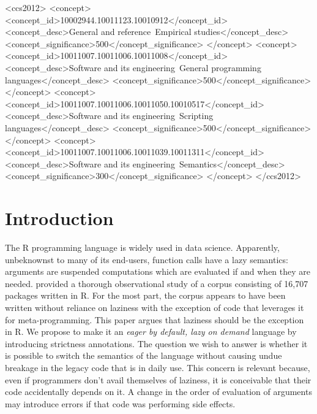 \documentclass[review,nonacm,screen,acmsmall,anonymous=true]{acmart}
\begin{document}
\begin{CCSXML}
<ccs2012>
<concept>
<concept_id>10002944.10011123.10010912</concept_id>
<concept_desc>General and reference~Empirical studies</concept_desc>
<concept_significance>500</concept_significance>
</concept>
<concept>
<concept_id>10011007.10011006.10011008</concept_id>
<concept_desc>Software and its engineering~General programming languages</concept_desc>
<concept_significance>500</concept_significance>
</concept>
<concept>
<concept_id>10011007.10011006.10011050.10010517</concept_id>
<concept_desc>Software and its engineering~Scripting languages</concept_desc>
<concept_significance>500</concept_significance>
</concept>
<concept>
<concept_id>10011007.10011006.10011039.10011311</concept_id>
<concept_desc>Software and its engineering~Semantics</concept_desc>
<concept_significance>300</concept_significance>
</concept>
</ccs2012>
\end{CCSXML}



\maketitle
\section{Introduction}

The R programming language is widely used in data science. Apparently, unbeknownst to many
of its end-users, function calls have a lazy semantics: arguments are suspended
computations which are evaluated if and when they are needed. \citet{oopsla19b}
provided a thorough observational study of a corpus consisting of 16,707
packages written in R. For the most part, the corpus appears to have been
written without reliance on laziness with the exception of code that leverages
it for meta-programming. This paper argues that laziness should be the exception
in R. We propose to make it an \emph{eager by default, lazy on demand} language
by introducing strictness annotations. The question we wish to answer is whether
it is possible to switch the semantics of the language without causing undue
breakage in the legacy code that is in daily use. This concern is relevant
because, even if programmers don't avail themselves of laziness, it is
conceivable that their code accidentally depends on it. A change in the order of
evaluation of arguments may introduce errors if that code was performing side
effects.
\end{document}
